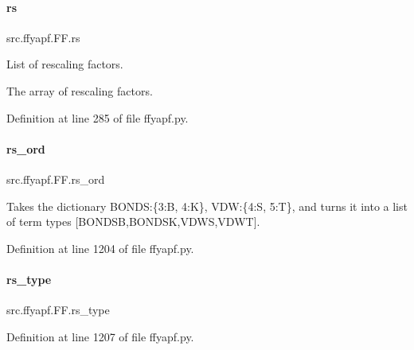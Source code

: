 \paragraph{\texorpdfstring{rs}{rs}}
{\footnotesize\ttfamily src.\+ffyapf.\+F\+F.\+rs}



List of rescaling factors. 

The array of rescaling factors. 

Definition at line 285 of file ffyapf.\+py.

\mbox{\label{classsrc_1_1ffyapf_1_1FF_a4a23c7867d6cc24c86f77fff3ce056e0}} 
\paragraph{\texorpdfstring{rs\+\_\+ord}{rs\_ord}}
{\footnotesize\ttfamily src.\+ffyapf.\+F\+F.\+rs\+\_\+ord}



Takes the dictionary \textquotesingle{}B\+O\+N\+DS\textquotesingle{}\+:\{3\+:\textquotesingle{}B\textquotesingle{}, 4\+:\textquotesingle{}K\textquotesingle{}\}, \textquotesingle{}V\+DW\textquotesingle{}\+:\{4\+:\textquotesingle{}S\textquotesingle{}, 5\+:\textquotesingle{}T\textquotesingle{}\}, and turns it into a list of term types \mbox{[}\textquotesingle{}B\+O\+N\+D\+SB\textquotesingle{},\textquotesingle{}B\+O\+N\+D\+SK\textquotesingle{},\textquotesingle{}V\+D\+WS\textquotesingle{},\textquotesingle{}V\+D\+WT\textquotesingle{}\mbox{]}. 



Definition at line 1204 of file ffyapf.\+py.

\mbox{\label{classsrc_1_1ffyapf_1_1FF_a7299d76bfff2489099eb88b4b5479245}} 
\paragraph{\texorpdfstring{rs\+\_\+type}{rs\_type}}
{\footnotesize\ttfamily src.\+ffyapf.\+F\+F.\+rs\+\_\+type}



Definition at line 1207 of file ffyapf.\+py.


